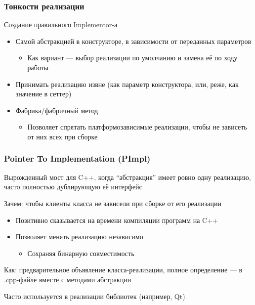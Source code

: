 \documentclass[xetex,mathserif,serif]{beamer}
\begin{document}
    \begin{frame}
        \frametitle{Тонкости реализации}
        Создание правильного Implementor-а
        \begin{itemize}
            \item Самой абстракцией в конструкторе, в зависимости от переданных параметров
            \begin{itemize}
                \item Как вариант --- выбор реализации по умолчанию и замена её по ходу работы
            \end{itemize}
            \item Принимать реализацию извне (как параметр конструктора, или, реже, как значение в сеттер)
            \item Фабрика/фабричный метод
            \begin{itemize}
                \item Позволяет спрятать платформозависимые реализации, чтобы не зависеть от них всех при сборке
            \end{itemize}
        \end{itemize}
    \end{frame}

    \begin{frame}
        \frametitle{Pointer To Implementation (PImpl)}
        Вырожденный мост для C++, когда ``абстракция'' имеет ровно одну реализацию, часто полностью дублирующую её интерфейс

        Зачем: чтобы клиенты класса не зависели при сборке от его реализации

        \begin{itemize}
            \item Позитивно сказывается на времени компиляции программ на C++
            \item Позволяет менять реализацию независимо
            \begin{itemize}
                \item Сохраняя бинарную совместимость
            \end{itemize}
        \end{itemize}

        Как: предварительное объявление класса-реализации, полное определение --- в .cpp-файле вместе с методами абстракции

        Часто используется в реализации библиотек (например, Qt)
    \end{frame}
\end{document}
